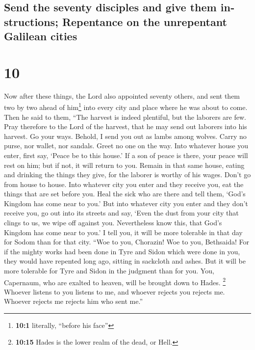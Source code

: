 \begin{paracol}{2}
\begin{otherlanguage}{english}
\hypertarget{send-the-seventy-disciples-and-give-them-instructions-repentance-on-the-unrepentant-galilean-cities}{%
\subsection{Send the seventy disciples and give them instructions;
Repentance on the unrepentant Galilean
cities}\label{send-the-seventy-disciples-and-give-them-instructions-repentance-on-the-unrepentant-galilean-cities}}

\hypertarget{section-19}{%
\section{10}\label{section-19}}

 Now after these things, the Lord also appointed seventy
others, and sent them two by two ahead of him\footnote{\textbf{10:1}
  literally, ``before his face''} into every city and place where he was
about to come.  Then he said to them, ``The harvest is
indeed plentiful, but the laborers are few. Pray therefore to the Lord
of the harvest, that he may send out laborers into his harvest.
 Go your ways. Behold, I send you out as lambs among
wolves.  Carry no purse, nor wallet, nor sandals. Greet no
one on the way.  Into whatever house you enter, first say,
`Peace be to this house.'  If a son of peace is there,
your peace will rest on him; but if not, it will return to you.
 Remain in that same house, eating and drinking the things
they give, for the laborer is worthy of his wages. Don't go from house
to house.  Into whatever city you enter and they receive
you, eat the things that are set before you.  Heal the
sick who are there and tell them, `God's Kingdom has come near to you.'
 But into whatever city you enter and they don't receive
you, go out into its streets and say,  `Even the dust
from your city that clings to us, we wipe off against you. Nevertheless
know this, that God's Kingdom has come near to you.'  I
tell you, it will be more tolerable in that day for Sodom than for that
city.  ``Woe to you, Chorazin! Woe to you, Bethsaida! For
if the mighty works had been done in Tyre and Sidon which were done in
you, they would have repented long ago, sitting in sackcloth and ashes.
 But it will be more tolerable for Tyre and Sidon in the
judgment than for you.  You, Capernaum, who are exalted
to heaven, will be brought down to Hades. \footnote{\textbf{10:15} Hades
  is the lower realm of the dead, or Hell.}  Whoever
listens to you listens to me, and whoever rejects you rejects me.
Whoever rejects me rejects him who sent me.''


\end{otherlanguage}
\end{paracol}
